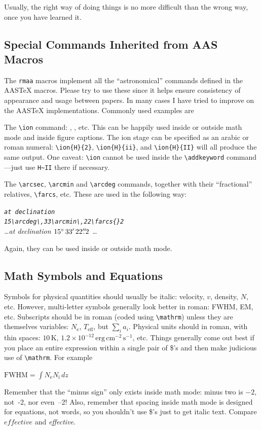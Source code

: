 \documentclass[debug]{rmxaa}
\newcommand{\CS}[1]{\texttt{\textbackslash #1}}
\newenvironment{Example}
{\begin{list}{}{\setlength{\leftmargin}{10pt}\setlength{\rightmargin}{10pt}}%
  \item[]\itshape}
  {\end{list}}
\begin{document}
Usually, the right way of doing things is no more difficult
than the wrong way, once you have learned it.   

\subsection{Special Commands Inherited from AAS Macros}
\label{sec:command}

The \texttt{rmaa} macros implement all the ``astronomical'' commands
defined in the AAS\TeX{} macros. Please try to use these since it
helps ensure consistency of appearance and usage between papers. In
many cases I have tried to improve on the AAS\TeX{}
implementations. Commonly used examples are 
\begin{enumerate}
\item The \CS{ion} command: , , etc. This can
  be happily used inside or outside math mode and inside figure
  captions. The ion stage can be specified as an arabic or roman
  numeral: \verb+\ion{H}{2}+, \verb+\ion{H}{ii}+, and
  \verb+\ion{H}{II}+ will all produce the same output. One caveat:
  \CS{ion} cannot be used inside the \CS{addkeyword} command---just
  use \verb+H~II+ there if necessary.
\item The \CS{arcsec}, \CS{arcmin} and \CS{arcdeg} commands, together
  with their ``fractional'' relatives, \CS{farcs}, etc. These are used
  in the following way: 
  \begin{Example}
    \verb|at declination|\\
    \verb|15\arcdeg\,33\arcmin\,22\farcs{}2|\\[\smallskipamount]
    \dots at declination $15^\circ\,33^\prime\,22\mkern1mu.\mkern-6mu^{\prime\prime}\mkern-1.5mu{}2$ \dots
  \end{Example}
  Again, they can be used inside or outside math mode. 
\end{enumerate}


\subsection{Math Symbols and Equations}
\label{sec:math}

Symbols for physical quantities should usually be italic: velocity,
$v$, density, $N$, etc. However, multi-letter symbols generally look
better in roman: FWHM, EM, etc. Subscripts should be in roman (coded
using \CS{mathrm}) unless they are themselves variables:
$N_\mathrm{e}$, $T_\mathrm{eff}$, but $\sum_i a_i$. Physical units
should in roman, with thin spaces: $10\,\mathrm{K}$, $1.2\times
10^{-12} \,\mathrm{erg\,cm^{-2}\,s^{-1}}$, etc. Things generally come
out best if you place an entire expression within a single pair of
\$'s and then make judicious use of \CS{mathrm}. For example
\begin{Example}
  $ \mathrm{FWHM} = \int N_\mathrm{e} N_\mathrm{i} \, dz $ 
\end{Example}
Remember that the ``minus sign'' only exists inside math mode: minus
two is $-2$, not~-2, nor \hbox{even --2!} Also, remember that spacing inside
math mode is designed for equations, not words, so you shouldn't use
\$'s just to get italic text. Compare $effective$ and
\textit{effective}. 
\end{document}
